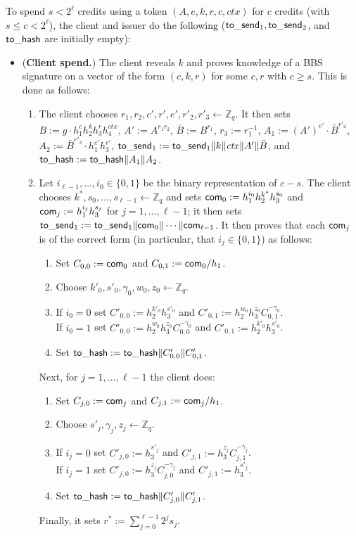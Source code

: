 \documentclass[11pt]{article}
\def\com{{\sf com}}
\def\send{{\sf to}\mbox{\_}{\sf send}}
\def\hash{{\sf to}\mbox{\_}{\sf hash}}
\def\Z{{\mathbb Z}}
\def\bool{\{0,1\}}
\def\Z{{\mathbb Z}}
\begin{document}
\medskip{}
To spend $s<2^\ell$ credits using a token $(A, e, k, r, c, \mathit{ctx})$ for $c$ credits (with $s \leq c< 2^\ell$), the client and issuer do the following ($\send_1, \send_2$, and $\hash$ are initially empty):
\begin{itemize}
    \item ({\bf Client spend.}) The client reveals $k$ and proves knowledge of a BBS signature on a vector of the form $(c, k, r)$ for some $c, r$ with $c \geq s$. This is done as follows:
    \begin{enumerate}
        \item The client chooses $r_1, r_2, c', r', e', r'_2, r'_3 \leftarrow \Z_q$. It then sets $B:= g \cdot h_1^c h_2^k h_3^r h_4^{\mathit{ctx}}$, $A':=A^{r_1 r_2}$, $\bar B:=B^{r_1}$, $r_3 := r_1^{-1}$,
 $A_1:=(A')^{e'} \cdot \bar B^{r'_2}$, $A_2:= \bar B^{r'_3} \cdot h_1^{c'} h_3^{r'}$, $\send_1:=\send_1\|k\|\mathit{ctx}\|A'\|\bar B$, and $\hash:=\hash\|A_1\|A_2$.
 
 \item Let $i_{\ell-1}, \ldots, i_0 \in \bool$ be the binary representation of $c-s$. %
The client chooses $k^*, s_0, \ldots, s_{\ell-1} \leftarrow \Z_q$ and sets
$\com_0:=h_1^{i_0} h_2^{k^*} h_3^{s_0}$ and
$\com_j:=h_1^{i_j} h_3^{s_j}$ for $j=1, \ldots, \ell-1$; it then sets $\send_1:=\send_1\|\com_0\|\cdots \|\com_{\ell-1}$.
It then proves that each $\com_j$ is of the correct form (in particular, that $i_j \in \bool$) as follows:
\begin{enumerate}
        \item Set $C_{0,0}:=\com_0$ and $C_{0,1} :=\com_0/h_1$.     
        \item Choose $k'_0, s'_0, \gamma_0, w_0, z_0 \leftarrow \Z_q$.
        \item If $i_0=0$ set $C'_{0,0} := h_2^{k'_0} h_3^{s'_0}$ and $C'_{0,1}:= h_2^{w_0} h_3^{z_0} C_{0,1}^{-\gamma_0}$.\\
              If $i_0=1$ set $C'_{0,0} := h_2^{w_0} h_3^{z_0} C_{0,0}^{-\gamma_0}$ and $C'_{0,1}:= h_2^{k'_0} h_3^{s'_0}$.
        \item Set $\hash:=\hash\|C'_{0,0} \| C'_{0,1}$.
        \end{enumerate}
Next, for $j=1, \ldots, \ell-1$ the client does: \begin{enumerate}
        \item Set $C_{j,0}:=\com_j$ and $C_{j,1} :=\com_j/h_1$.     
        \item Choose $s'_j, \gamma_j, z_j \leftarrow \Z_q$.
        \item If $i_j=0$ set $C'_{j,0} := h_3^{s'_j}$ and $C'_{j,1}:=h_3^{z_j} C_{j,1}^{-\gamma_j}$.\\
              If $i_j=1$ set $C'_{j,0} := h_3^{z_j} C_{j,0}^{-\gamma_j}$ and $C'_{j,1}:=h_3^{s'_j}$.
        \item Set $\hash:=\hash\|C'_{j,0} \| C'_{j,1}$.
        \end{enumerate}
        Finally, it sets  
        $r^* := \sum_{j=0}^{\ell-1} 2^j s_j$.
     

\end{enumerate}
\end{itemize}
\end{document}
